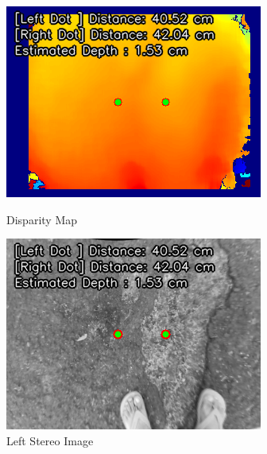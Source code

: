 \begin{figure}[htbp]
	\centering
	\begin{minipage}{0.32\textwidth}
		\centering
		\includegraphics[width=\textwidth]{disparity.png}
		\caption{Disparity Map}
		\label{fig:image1}
	\end{minipage}
	\hfill
	\begin{minipage}{0.32\textwidth}
		\centering
		\includegraphics[width=\textwidth]{left.png}
		\caption{Left Stereo Image}
		\label{fig:image2}
	\end{minipage}
	\hfill
	\begin{minipage}{0.32\textwidth}
		\centering

\end{minipage}
\end{figure}
